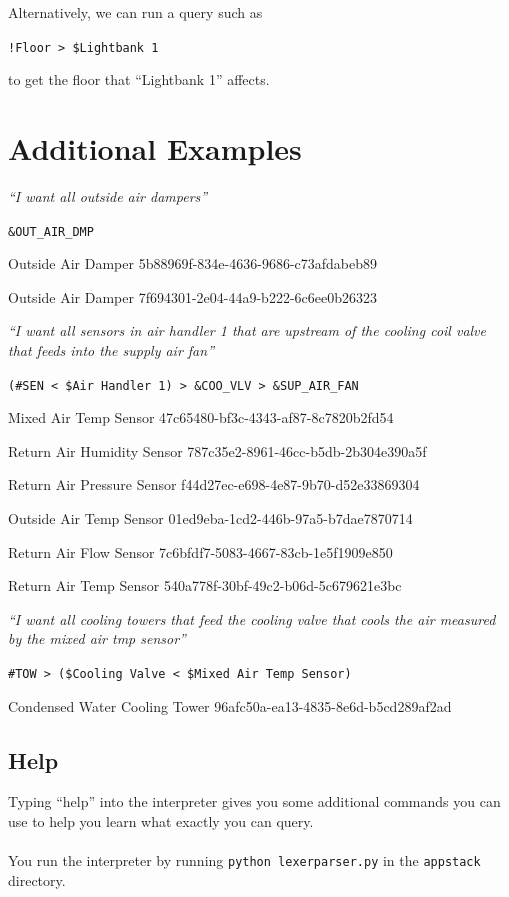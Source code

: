 \documentclass{article}
\begin{document}
Alternatively, we can run a query such as 
\begin{center}
\verb+!Floor > $Lightbank 1+
\end{center}
to get the floor that ``Lightbank 1'' affects.

\section{Additional Examples} %
\label{sub:additional_examples}

\begin{center}\emph{``I want all outside air dampers''}
	
	\verb+&OUT_AIR_DMP+
	
	Outside Air Damper 5b88969f-834e-4636-9686-c73afdabeb89
	
	Outside Air Damper 7f694301-2e04-44a9-b222-6c6ee0b26323
\end{center}

\begin{center}\emph{``I want all sensors in air handler 1 that are upstream of the cooling coil valve that feeds into the supply air fan''}
	
	\verb+(#SEN < $Air Handler 1) > &COO_VLV > &SUP_AIR_FAN+
	
	Mixed Air Temp Sensor 47c65480-bf3c-4343-af87-8c7820b2fd54
	
	Return Air Humidity Sensor 787c35e2-8961-46cc-b5db-2b304e390a5f
	
	Return Air Pressure Sensor f44d27ec-e698-4e87-9b70-d52e33869304
	
	Outside Air Temp Sensor 01ed9eba-1cd2-446b-97a5-b7dae7870714
	
	Return Air Flow Sensor 7c6bfdf7-5083-4667-83cb-1e5f1909e850

	Return Air Temp Sensor 540a778f-30bf-49c2-b06d-5c679621e3bc
\end{center}

\begin{center}\emph{``I want all cooling towers that feed the cooling valve that cools the air measured by the mixed air tmp sensor''}
	
	\verb+#TOW > ($Cooling Valve < $Mixed Air Temp Sensor)+
	
	Condensed Water Cooling Tower 96afc50a-ea13-4835-8e6d-b5cd289af2ad
\end{center}

\subsection{Help} %
\label{sub:help}
Typing ``help'' into the interpreter gives you some additional commands you can use to help you learn what exactly you can query.
\\\\
You run the interpreter by running \verb+python lexerparser.py+ in the \verb+appstack+ directory.
\end{document}

